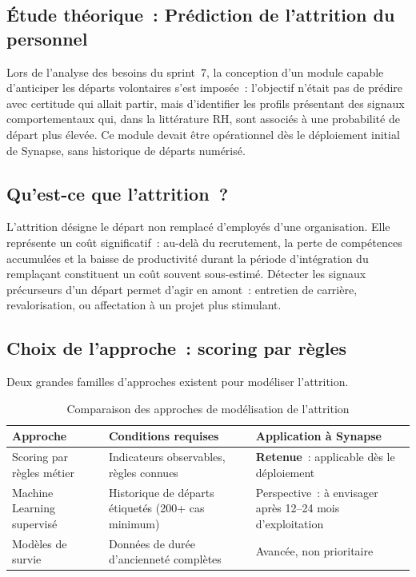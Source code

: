 ﻿%

\subsection{Étude théorique~: Prédiction de l'attrition du personnel}

Lors de l'analyse des besoins du sprint~7, la conception d'un module
capable d'anticiper les départs volontaires s'est imposée~: l'objectif n'était pas de
prédire avec certitude qui allait partir, mais d'identifier les profils présentant
des signaux comportementaux qui, dans la littérature RH, sont associés à une
probabilité de départ plus élevée. Ce module devait être opérationnel dès le
déploiement initial de Synapse, sans historique de départs numérisé.

\subsection{Qu'est-ce que l'attrition~?}

L'attrition désigne le départ non remplacé d'employés d'une organisation. Elle
représente un coût significatif~: au-delà du recrutement, la perte de compétences
accumulées et la baisse de productivité durant la période d'intégration du
remplaçant constituent un coût souvent sous-estimé. Détecter les signaux
précurseurs d'un départ permet d'agir en amont~: entretien de carrière,
revalorisation, ou affectation à un projet plus stimulant.

\subsection{Choix de l'approche~: scoring par règles}

Deux grandes familles d'approches existent pour modéliser l'attrition.

\begin{table}[H]
\centering
\caption{Comparaison des approches de modélisation de l'attrition}
\label{tab:attrition_approaches_theory}
\begin{tabularx}{\textwidth}{|l|L|L|}
\hline
{}
\textbf{Approche} & \textbf{Conditions requises} & \textbf{Application à Synapse} \\
\hline
{}
Scoring par règles métier & Indicateurs observables, règles connues & \textbf{Retenue}~: applicable dès le déploiement \\
\hline
Machine Learning supervisé & Historique de départs étiquetés (200+ cas minimum) & Perspective~: à envisager après 12--24 mois d'exploitation \\
\hline
{}
Modèles de survie & Données de durée d'ancienneté complètes & Avancée, non prioritaire \\
\hline
\end{tabularx}
\end{table}

